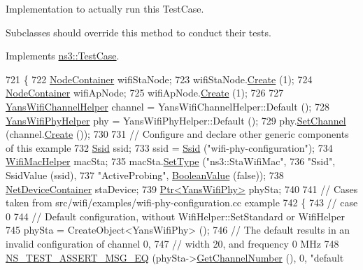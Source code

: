 Implementation to actually run this Test\+Case. 

Subclasses should override this method to conduct their tests. 

Implements \hyperlink{classns3_1_1TestCase_a8ff74680cf017ed42011e4be51917a24}{ns3\+::\+Test\+Case}.


\begin{DoxyCode}
721 \{
722   \hyperlink{classns3_1_1NodeContainer}{NodeContainer} wifiStaNode;
723   wifiStaNode.\hyperlink{classns3_1_1NodeContainer_a787f059e2813e8b951cc6914d11dfe69}{Create} (1);
724   \hyperlink{classns3_1_1NodeContainer}{NodeContainer} wifiApNode;
725   wifiApNode.\hyperlink{classns3_1_1NodeContainer_a787f059e2813e8b951cc6914d11dfe69}{Create} (1);
726 
727   \hyperlink{classns3_1_1YansWifiChannelHelper}{YansWifiChannelHelper} channel = YansWifiChannelHelper::Default ();
728   \hyperlink{classns3_1_1YansWifiPhyHelper}{YansWifiPhyHelper} phy = YansWifiPhyHelper::Default ();
729   phy.\hyperlink{classns3_1_1YansWifiPhyHelper_ad2e9a27587dd4ff320435c93cc2676de}{SetChannel} (channel.\hyperlink{classns3_1_1YansWifiChannelHelper_a0532e292ab9452f3cf630c848708e563}{Create} ());
730 
731   \textcolor{comment}{// Configure and declare other generic components of this example}
732   \hyperlink{classns3_1_1Ssid}{Ssid} ssid;
733   ssid = \hyperlink{classns3_1_1Ssid}{Ssid} (\textcolor{stringliteral}{"wifi-phy-configuration"});
734   \hyperlink{classns3_1_1WifiMacHelper}{WifiMacHelper} macSta;
735   macSta.\hyperlink{classns3_1_1WifiMacHelper_a382d8df76a1dd7007179d1963b4b6bc6}{SetType} (\textcolor{stringliteral}{"ns3::StaWifiMac"},
736                   \textcolor{stringliteral}{"Ssid"}, SsidValue (ssid),
737                   \textcolor{stringliteral}{"ActiveProbing"}, \hyperlink{classns3_1_1BooleanValue}{BooleanValue} (\textcolor{keyword}{false}));
738   \hyperlink{classns3_1_1NetDeviceContainer}{NetDeviceContainer} staDevice;
739   \hyperlink{classns3_1_1Ptr}{Ptr<YansWifiPhy>} phySta;
740 
741   \textcolor{comment}{// Cases taken from src/wifi/examples/wifi-phy-configuration.cc example}
742   \{
743     \textcolor{comment}{// case 0}
744     \textcolor{comment}{// Default configuration, without WifiHelper::SetStandard or WifiHelper}
745     phySta = CreateObject<YansWifiPhy> ();
746     \textcolor{comment}{// The default results in an invalid configuration of channel 0,}
747     \textcolor{comment}{// width 20, and frequency 0 MHz}
748     \hyperlink{group__testing_ga2a9d78cffb3db8e867c35fff0b698cf5}{NS\_TEST\_ASSERT\_MSG\_EQ} (phySta->\hyperlink{classns3_1_1WifiPhy_a5cf0ccf06109ace61db51c83e91b7e8d}{GetChannelNumber} (), 0, \textcolor{stringliteral}{"default
}
\end{DoxyCode}

